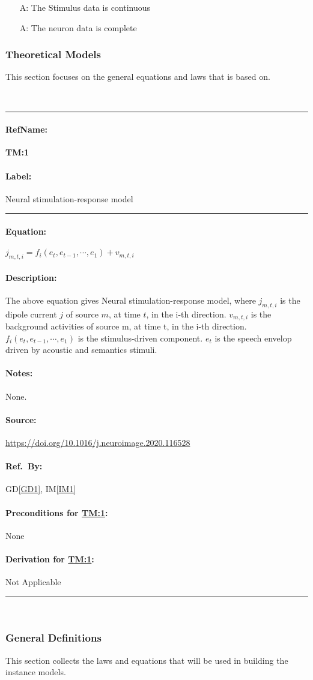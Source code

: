 \documentclass[12pt]{article}
\newcounter{assumpnum} %
\newcommand{\deftheory}[9][Not Applicable]
{
\newpage
\noindent \rule{\textwidth}{0.5mm}

\paragraph{RefName: } \textbf{#2} \phantomsection
\label{#2}

\paragraph{Label:} #3

\noindent \rule{\textwidth}{0.5mm}

\paragraph{Equation:}

#4

\paragraph{Description:}

#5

\paragraph{Notes:}

#6

\paragraph{Source:}

#7

\paragraph{Ref.\ By:}

#8

\paragraph{Preconditions for \hyperref[#2]{#2}:}
\label{#2_precond}

#9

\paragraph{Derivation for \hyperref[#2]{#2}:}
\label{#2_deriv}

#1

\noindent \rule{\textwidth}{0.5mm}

}
\begin{document}
\begin{itemize}

  \item[A\refstepcounter{assumpnum}\theassumpnum:] The Stimulus data is continuous
  \item[A\refstepcounter{assumpnum}\theassumpnum:] The neuron data is complete

\end{itemize}

\subsubsection{Theoretical Models}\label{sec_theoretical}

This section focuses on the general equations and laws that \progname{} is based on.

~\newline

\noindent
\deftheory
{TM:1}
{Neural stimulation-response model}
{
${j}_{m, t, i}=f_{i}\left(e_{t}, e_{t-1}, \cdots, e_{1}\right)+v_{m, t, i}$
}
{
  The above equation gives Neural stimulation-response model, where ${j}_{m, t, i}$
is the dipole current $j$ of source $m$, at time $t$, in the i-th direction. ${v_{m, t, i}}$ is the background
activities of source m, at time t, in the i-th direction. ${f_{i}\left(e_{t}, e_{t-1}, \cdots, e_{1}\right)}$
is the stimulus-driven component. $e_{t}$ is the speech envelop driven by acoustic and semantics stimuli.
}
{
None.
}
{
  \url{https://doi.org/10.1016/j.neuroimage.2020.116528}
}
{
  GD\ref{GD1},
  IM\ref{IM1}
}
{
None
}
{}

~\newline

\subsubsection{General Definitions}\label{sec_gendef}

This section collects the laws and equations that will be used in building the instance models.

~\newline
\end{document}
